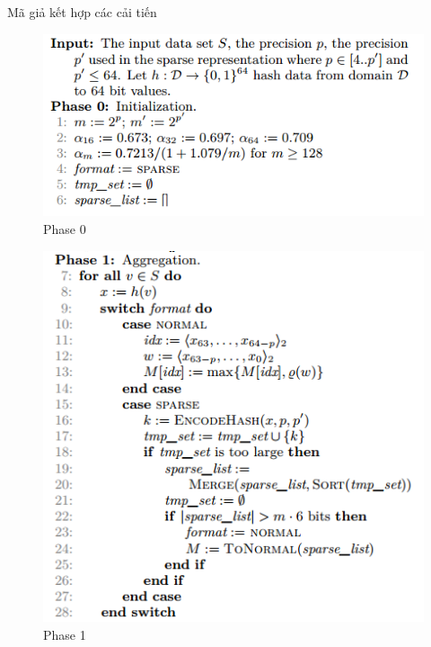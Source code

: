 \documentclass{beamer}
\begin{document}
\begin{frame}{Mã giả kết hợp các cải tiến}
\begin{figure}[h]
\includegraphics[scale=0.6]{img5.png}
\caption{Phase 0}
\end{figure}
\end{frame}
\begin{frame}{}
\begin{figure}[h]
\includegraphics[scale=0.6]{img6.png}
\caption{Phase 1}
\end{figure}
\end{frame}
\end{document}

